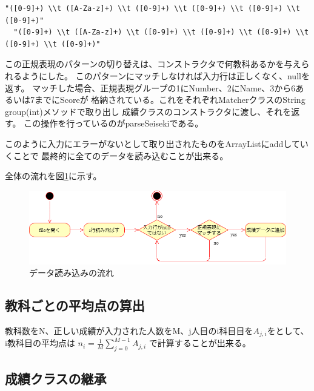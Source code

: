\documentclass[dvipdfmx]{jsarticle}
\begin{document}
\begin{lstlisting}[caption=入力行の構文解析に使用する正規表現,label=regex2]
  "([0-9]+) \\t ([A-Za-z]+) \\t ([0-9]+) \\t ([0-9]+) \\t ([0-9]+) \\t ([0-9]+)"
  "([0-9]+) \\t ([A-Za-z]+) \\t ([0-9]+) \\t ([0-9]+) \\t ([0-9]+) \\t ([0-9]+) \\t ([0-9]+)"
\end{lstlisting}

この正規表現のパターンの切り替えは、コンストラクタで何教科あるかを与えられるようにした。
このパターンにマッチしなければ入力行は正しくなく、nullを返す。
マッチした場合、正規表現グループの1にNumber、2にName、3から6あるいは7までにScoreが
格納されている。これをそれぞれMatcherクラスのString group(int)メソッドで取り出し
成績クラスのコンストラクタに渡し、それを返す。
この操作を行っているのがparseSeisekiである。

このように入力にエラーがないとして取り出されたものをArrayListにaddしていくことで
最終的に全てのデータを読み込むことが出来る。

全体の流れを図\ref{flowchart1}に示す。
\begin{figure}[H]
  \centering
  \includegraphics[width=0.9\hsize]{../pic/flow1.png}
  \caption{データ読み込みの流れ}
  \label{flowchart1}
\end{figure}

\subsection{教科ごとの平均点の算出}

教科数をN、正しい成績が入力された人数をM、j人目のi科目目を$A_{j,i}$をとして、
i教科目の平均点は
$\displaystyle n_i = \frac{1}{M}\sum_{j=0}^{M-1}A_{j,i}$
で計算することが出来る。

\subsection{成績クラスの継承}
\end{document}
